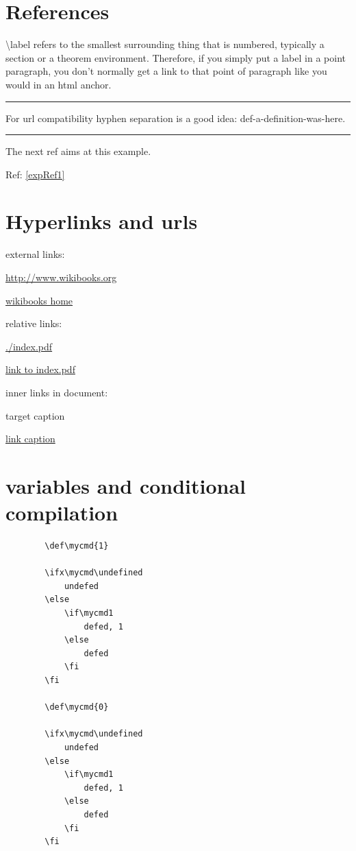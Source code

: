 \documentclass[12pt]{article}
\newcommand{\inOut}[1]{#1}                                %
\begin{document}
\section{References}\label{secRef}

    \begin{remark} \label{remLab1}
        \textbackslash{}label refers to the smallest surrounding thing that is numbered, typically a section or a theorem environment. Therefore, if you simply put a label in a point paragraph, you don't normally get a link to that point of paragraph like you would in an html anchor.
    \end{remark}\hrule

    \begin{remark} \label{remLab2}
        For url compatibility hyphen separation is a good idea: def-a-definition-was-here.
    \end{remark}\hrule

    \begin{example} \label{expRef1}
        \inOut{
            The next ref aims at this example.

            Ref: \ref{expRef1}
        }
    \end{example}

\section{Hyperlinks and urls}\label{hyperlinks-urls}

    external links:

    \url{http://www.wikibooks.org}

    \href{http://www.wikibooks.org}{wikibooks home}

    relative links:

    \url{./index.pdf}

    \href{./index.pdf}{link to index.pdf}

    inner links in document:

    \hypertarget{label}{target caption}

    \hyperlink{label}{link caption}

    \section{variables and conditional compilation}

    \begin{lstlisting}
        \def\mycmd{1}

        \ifx\mycmd\undefined
            undefed
        \else
            \if\mycmd1
                defed, 1
            \else
                defed
            \fi
        \fi

        \def\mycmd{0}

        \ifx\mycmd\undefined
            undefed
        \else
            \if\mycmd1
                defed, 1
            \else
                defed
            \fi
        \fi
    \end{lstlisting}
\end{document}
